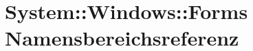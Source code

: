 \hypertarget{namespaceSystem_1_1Windows_1_1Forms}{
\section{System::Windows::Forms Namensbereichsreferenz}
\label{namespaceSystem_1_1Windows_1_1Forms}
}




